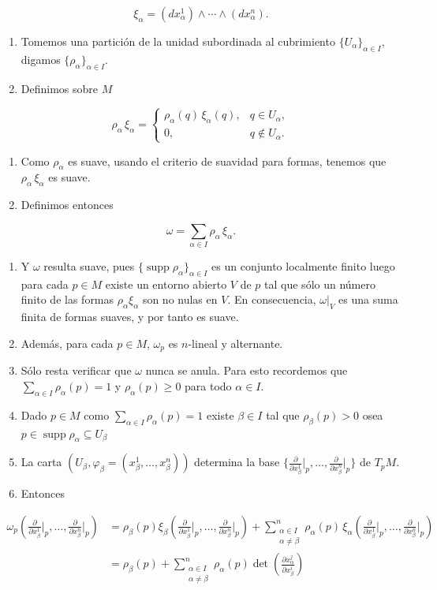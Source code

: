 \begin{bookproof}{}
\[
\xi_\alpha=(dx_\alpha^1)\wedge\cdots\wedge(dx_\alpha^n).
\]
\begin{enumerate}[start=3]
\item Tomemos una partición de la unidad subordinada al cubrimiento $\{U_\alpha\}_{\alpha\in I}$, digamos $\{\rho_\alpha\}_{\alpha\in I}$.
\item Definimos sobre $M$
\end{enumerate}
\[
\rho_\alpha\,\xi_\alpha=\begin{cases}\rho_\alpha(q)\,\xi_\alpha(q),&q\in U_\alpha,\\0,&q\notin U_\alpha.\end{cases}
\]
\begin{enumerate}[start=5]
\item Como $\rho_\alpha$ es suave, usando el criterio de suavidad para formas, tenemos que $\rho_\alpha\,\xi_\alpha$ es suave.
\item Definimos entonces
\end{enumerate}
\[
\omega=\sum_{\alpha\in I}\rho_\alpha\,\xi_\alpha.
\]
\begin{enumerate}[start=7]
\item Y $\omega$ resulta suave, pues $\{\operatorname{supp}\rho_\alpha\}_{\alpha\in I}$ es un conjunto localmente finito luego para cada $p\in M$ existe un entorno abierto $V$ de $p$ tal que sólo un número finito de las formas $\rho_\alpha\xi_\alpha$ son no nulas en $V$. En consecuencia, $\omega|_V$ es una suma finita de formas suaves, y por tanto es suave.
\item Además, para cada $p\in M$, $\omega_{p}$ es $n$-lineal y alternante.
\item Sólo resta verificar que $\omega$ nunca se anula. Para esto recordemos que $\sum_{\alpha\in I}\rho_\alpha(p)=1$ y $\rho_\alpha(p)\ge0$ para todo $\alpha\in I$.
\item Dado $p\in M$ como $\sum_{\alpha\in I}\rho_\alpha(p)=1$ existe $\beta\in I$ tal que $\rho_\beta(p)>0$ osea $p\in \operatorname{supp} \rho_{\alpha }\subseteq U_{\beta}$
\item La carta $(U_\beta,\varphi_\beta=(x_\beta^1,\ldots,x_\beta^n))$ determina la base $\{\frac{\partial}{\partial x_\beta^1}\big|_p,\ldots,\frac{\partial}{\partial x_\beta^n}\big|_p\}$ de $T_pM$.
\item Entonces
\end{enumerate}
\[
\begin{aligned}\omega_{p}\!\left(\frac{\partial}{\partial x_\beta^1}\bigg|_p,\ldots,\frac{\partial}{\partial x_\beta^n}\bigg|_p\right)&= \rho_{\beta }(p)\xi_{\beta}\!\left(\frac{\partial}{\partial x_\beta^1}\bigg|_p,\ldots,\frac{\partial}{\partial x_\beta^n}\bigg|_p\right)+\sum_{\substack{\alpha\in I \\ \alpha  \neq \beta }}^{n} \rho_\alpha(p)\,\xi_{\alpha}\!\left(\frac{\partial}{\partial x_\beta^1}\bigg|_p,\ldots,\frac{\partial}{\partial x_\beta^n}\bigg|_p\right)\\&=\rho_{\beta }(p)+\sum_{\substack{\alpha\in I \\ \alpha  \neq \beta }}^{n} \rho_\alpha(p)\det\left(\frac{\partial x_{\alpha }^{j } }{\partial x_{\beta }^{i}}\right) \end{aligned}
\]
\end{bookproof}
